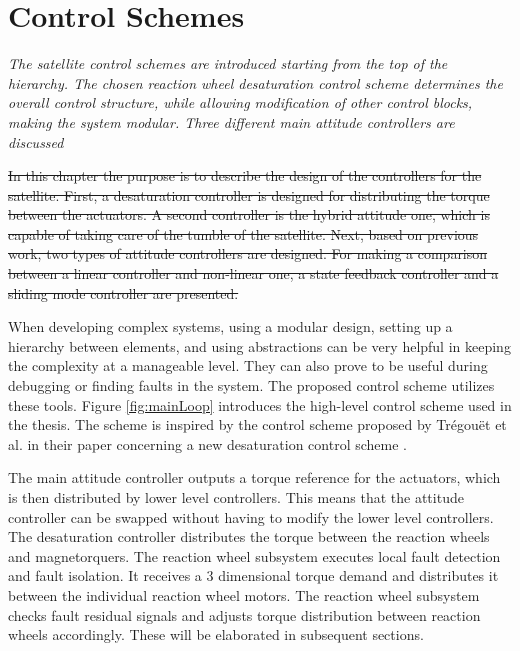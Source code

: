 \chapter{Control Schemes}
\textit{The satellite control schemes are introduced starting from the top of the hierarchy. The chosen reaction wheel desaturation control scheme determines the overall control structure, while allowing modification of other control blocks, making the system modular. Three different main attitude controllers are discussed}

\sout{In this chapter the purpose is to describe the design of the controllers for the satellite. First, a desaturation controller is designed for distributing the torque between the actuators. A second controller is the hybrid attitude one, which is capable of taking care of the tumble of the satellite. Next, based on previous work, two types of attitude controllers are designed. For making a comparison between a linear controller and non-linear one, a state feedback controller and a sliding mode controller are presented.}



When developing complex systems, using a modular design, setting up a hierarchy between elements, and using abstractions can be very helpful in keeping the complexity at a manageable level. They can also prove to be useful during debugging or finding faults in the system. The proposed control scheme utilizes these tools. Figure  \ref{fig:mainLoop} introduces the high-level control scheme used in the thesis. The scheme is inspired by the control scheme proposed by Trégouët et al. in their paper concerning a new desaturation control scheme \cite{DesatTregouet}. 

 The main attitude controller outputs a torque reference for the actuators, which is then distributed by lower level controllers. This means that the attitude controller can be swapped without having to modify the lower level controllers. The desaturation controller distributes the torque between the reaction wheels and magnetorquers. The reaction wheel subsystem executes local fault detection and fault isolation. It receives a 3 dimensional torque demand and distributes it between the individual reaction wheel motors. The reaction wheel subsystem checks fault residual signals and adjusts torque distribution between reaction wheels accordingly. These will be elaborated in subsequent sections.
 
